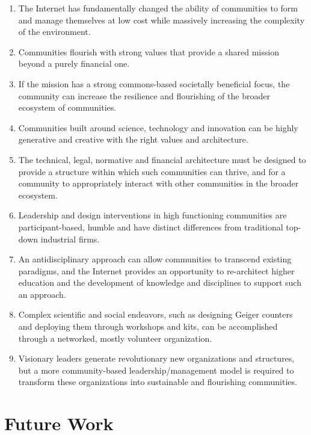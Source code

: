 \begin{enumerate}
\item The Internet has fundamentally changed the ability of communities to form and manage themselves at low cost while massively increasing the complexity of the environment.
\item Communities flourish with strong values that provide a shared mission beyond a purely financial one.
\item If the mission has a strong commons-based societally beneficial focus, the community can increase the resilience and flourishing of the broader ecosystem of communities.
\item Communities built around science, technology and innovation can be highly generative and creative with the right values and architecture.
\item The technical, legal, normative and financial architecture must be designed to provide a structure within which such communities can thrive, and for a community to appropriately interact with other communities in the broader ecosystem.
\item Leadership and design interventions in high functioning communities are participant-based, humble and have distinct differences from traditional top-down industrial firms.
\item An antidisciplinary approach can allow communities to transcend existing paradigms, and the Internet provides an opportunity to re-architect higher education and the development of knowledge and disciplines to support such an approach.
\item Complex scientific and social endeavors, such as designing Geiger counters and deploying them through workshops and kits, can be accomplished through a networked, mostly volunteer organization. 
\item Visionary leaders generate revolutionary new organizations and structures, but a more community-based leadership/management model is required to transform these organizations into sustainable and flourishing communities.
\end{enumerate}

\section{Future Work}

